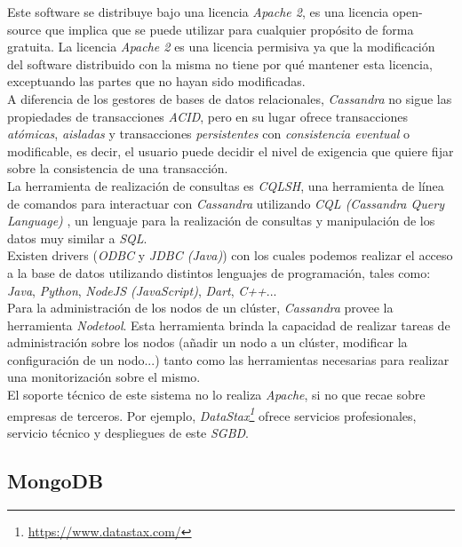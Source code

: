 \documentclass[10pt]{article}
\begin{document}
Este software se distribuye bajo una licencia \emph{Apache 2}, es una licencia open-source que implica que se puede utilizar para cualquier propósito de forma gratuita. La licencia \emph{Apache 2} es una licencia permisiva ya que la modificación del software distribuido con la misma no tiene por qué mantener esta licencia, exceptuando las partes que no hayan sido modificadas. \cite{WIKI:6}\\

A diferencia de los gestores de bases de datos relacionales, \emph{Cassandra} no sigue las propiedades de transacciones \emph{ACID}, pero en su lugar ofrece transacciones \emph{atómicas}, \emph{aisladas} y transacciones \emph{persistentes} con \emph{consistencia eventual} o modificable, es decir, el usuario puede decidir el nivel de exigencia que quiere fijar sobre la consistencia de una transacción. \cite{DS:1} \\

La herramienta de realización de consultas es \emph{CQLSH}, una herramienta de línea de comandos para interactuar con \emph{Cassandra} utilizando \emph{CQL (Cassandra Query Language)} \cite{AP:3}, un lenguaje para la realización de consultas y manipulación de los datos muy similar a \emph{SQL}. \cite{WIKI:5} \\
Existen drivers (\emph{ODBC} y \emph{JDBC (Java)}) con los cuales podemos realizar el acceso a la base de datos utilizando distintos lenguajes de programación, tales como: \emph{Java}, \emph{Python}, \emph{NodeJS (JavaScript)}, \emph{Dart}, \emph{C++}... \cite{AP:4} \\
Para la administración de los nodos de un clúster, \emph{Cassandra} provee la herramienta \emph{Nodetool}. Esta herramienta brinda la capacidad de realizar tareas de administración sobre los nodos (añadir un nodo a un clúster, modificar la configuración de un nodo...) tanto como las herramientas necesarias para realizar una monitorización sobre el mismo. \cite{WIKI:5} \\

El soporte técnico de este sistema no lo realiza \emph{Apache}, si no que recae sobre empresas de terceros. Por ejemplo, \emph{DataStax\footnote{\url{https://www.datastax.com/}}} ofrece servicios profesionales, servicio técnico y despliegues de este \emph{SGBD}. \cite{APW:1}\\

\subsection{MongoDB}
\end{document}
